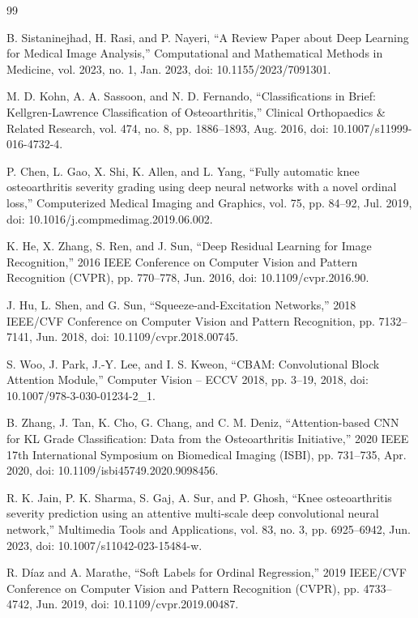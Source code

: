 \documentclass[letterpaper, 10 pt, conference]{ieeeconf}  %
\begin{document}
\begin{thebibliography}{99}

 B. Sistaninejhad, H. Rasi, and P. Nayeri, “A Review Paper about Deep Learning for Medical Image Analysis,” Computational and Mathematical Methods in Medicine, vol. 2023, no. 1, Jan. 2023, doi: 10.1155/2023/7091301.

 M. D. Kohn, A. A. Sassoon, and N. D. Fernando, “Classifications in Brief: Kellgren-Lawrence Classification of Osteoarthritis,” Clinical Orthopaedics \& Related Research, vol. 474, no. 8, pp. 1886–1893, Aug. 2016, doi: 10.1007/s11999-016-4732-4.

 P. Chen, L. Gao, X. Shi, K. Allen, and L. Yang, “Fully automatic knee osteoarthritis severity grading using deep neural networks with a novel ordinal loss,” Computerized Medical Imaging and Graphics, vol. 75, pp. 84–92, Jul. 2019, doi: 10.1016/j.compmedimag.2019.06.002.

 K. He, X. Zhang, S. Ren, and J. Sun, “Deep Residual Learning for Image Recognition,” 2016 IEEE Conference on Computer Vision and Pattern Recognition (CVPR), pp. 770–778, Jun. 2016, doi: 10.1109/cvpr.2016.90.

 J. Hu, L. Shen, and G. Sun, “Squeeze-and-Excitation Networks,” 2018 IEEE/CVF Conference on Computer Vision and Pattern Recognition, pp. 7132–7141, Jun. 2018, doi: 10.1109/cvpr.2018.00745.

 S. Woo, J. Park, J.-Y. Lee, and I. S. Kweon, “CBAM: Convolutional Block Attention Module,” Computer Vision – ECCV 2018, pp. 3–19, 2018, doi: 10.1007/978-3-030-01234-2\_1.

 B. Zhang, J. Tan, K. Cho, G. Chang, and C. M. Deniz, “Attention-based CNN for KL Grade Classification: Data from the Osteoarthritis Initiative,” 2020 IEEE 17th International Symposium on Biomedical Imaging (ISBI), pp. 731–735, Apr. 2020, doi: 10.1109/isbi45749.2020.9098456.

 R. K. Jain, P. K. Sharma, S. Gaj, A. Sur, and P. Ghosh, “Knee osteoarthritis severity prediction using an attentive multi-scale deep convolutional neural network,” Multimedia Tools and Applications, vol. 83, no. 3, pp. 6925–6942, Jun. 2023, doi: 10.1007/s11042-023-15484-w.

 R. Díaz and A. Marathe, “Soft Labels for Ordinal Regression,” 2019 IEEE/CVF Conference on Computer Vision and Pattern Recognition (CVPR), pp. 4733–4742, Jun. 2019, doi: 10.1109/cvpr.2019.00487.


\end{thebibliography}
\end{document}
